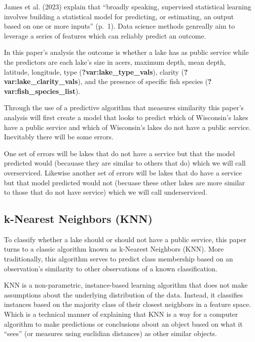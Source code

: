 \documentclass[
]{article}
\begin{document}
James et al. (2023) explain that ``broadly speaking, supervised
statistical learning involves building a statistical model for
predicting, or estimating, an output based on one or more inputs''
(p.~1). Data science methods genreally aim to leverage a series of
features which can reliably predict an outcome.

In this paper's analysis the outcome is whether a lake has as public
service while the predictors are each lake's size in acers, maximum
depth, mean depth, latitude, longitude, type
(\textbf{?var:lake\_type\_vals}), clarity
(\textbf{?var:lake\_clarity\_vals}), and the presence of specific fish
species (\textbf{?var:fish\_species\_list}).

Through the use of a predictive algorithm that measures similarity this
paper's analysis will first create a model that looks to predict which
of Wisconsin's lakes have a public service and which of Wisconsin's
lakes do not have a public service. Inevitably there will be some
errors.

One set of errors will be lakes that do not have a service but that the
model predicted would (becauase they are similar to others that do)
which we will call overserviced. Likewise another set of errors will be
lakes that do have a service but that model predicted would not (becuase
these other lakes are more similar to those that do not have service)
which we will call underserviced.

\subsection{k-Nearest Neighbors (KNN)}\label{k-nearest-neighbors-knn}

To classify whether a lake should or should not have a public service,
this paper turns to a classic algorithm known as k-Nearest Neighbors
(KNN). More traditionally, this algorithm serves to predict class
membership based on an observation's similarity to other observations of
a known classification.

KNN is a non-parametric, instance-based learning algorithm that does not
make assumptions about the underlying distribution of the data. Instead,
it classifies instances based on the majority class of their closest
neighbors in a feature space. Which is a technical manner of explaining
that KNN is a way for a computer algorithm to make predictions or
conclusions about an object based on what it ``sees'' (or measures using
euclidian distances) as other similar objects.
\end{document}

